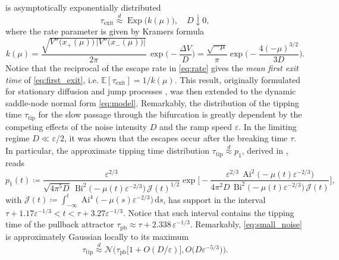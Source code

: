 \documentclass[11pt,a4paper]{article}
\theoremstyle{plain}
\theoremstyle{definition}
\theoremstyle{remark}
\newcommand{\dd}{\mathrm{d}}
\newcommand{\Ai}{\operatorname{Ai}}
\newcommand{\Bi}{\operatorname{Bi}}
\newcommand{\E}{\mathbb{E}}
\newcommand{\Exp}{\operatorname{Exp}}
\begin{document}
%
is asymptotically exponentially distributed \cite[Thm.~$2.3$]{Berglund2013}
%
\begin{equation}\label{eq:large_deviation_principle}
        \tau_{\mathrm{exit}}\overset{d}{\approx}\Exp\bigl(k(\mu)\bigr) , \quad D\downarrow0,
\end{equation}
%
where the rate parameter is given by Kramers formula
%
\begin{equation}\label{eq:rate}
        k(\mu)=\frac{\sqrt{V''\bigl(x_+(\mu)\bigr)\,|V''\bigl(x_-(\mu)\bigr)|}}{2\pi}\,\exp\biggl(-\frac{\Delta V}{D}\biggr)
        =\frac{\sqrt{-\mu}}{\pi}\exp\biggl(-\frac{4(-\mu)^{3/2}}{3D}\biggr).
\end{equation}
%
Notice that the reciprocal of the escape rate in \eqref{eq:rate} gives the \emph{mean first exit time} of \eqref{eq:first_exit}, i.e. $\E[\tau_{\mathrm{exit}}] = 1/k(\mu)$.
This result, originally formulated for stationary diffusion \cite{Day1983} and jump processes \cite{Imkeller2006}, was then extended to the dynamic saddle-node normal form \eqref{eq:model}.
Remarkably, the distribution of the tipping time $\tau_{\mathrm{tip}}$ for the slow passage through the bifurcation is greatly dependent by the competing effects of the noise intensity $D$ and the ramp speed $\varepsilon$.
In the limiting regime $D\ll\varepsilon/2$, it was shown that the escapes occur after the breaking time $\tau$.
In particular, the approximate tipping time distribution $\tau_{\mathrm{tip}}\overset{d}{\approx}p_1$, derived in \cite[Eq.~$(19)$]{Miller2012}, reads
%
\begin{equation}\label{eq:small_noise}
        p_1(t)\coloneqq\frac{\varepsilon^{2/3}}{\sqrt{4\pi^{5}D}\,\Bi^{2}\bigl(-\mu(t)\varepsilon^{-2/3}\bigr)\,\mathcal J(t)^{1/2}}
        \exp\Biggl[-\frac{\varepsilon^{2/3}\,\Ai^{2}\bigl(-\mu(t)\varepsilon^{-2/3}\bigr)}
        {4\pi^{2}D\,\Bi^{2}\bigl(-\mu(t)\varepsilon^{-2/3}\bigr)\,\mathcal J(t)}\Biggr] ,
\end{equation}
%
with $\mathcal J(t)\coloneqq\int_{-\infty}^{t}\Ai^{4}\bigl(-\mu(s)\varepsilon^{-2/3}\bigr)\,\dd s$, has support in the interval $\tau+1.17 \varepsilon^{-1/3} < t < \tau + 3.27 \varepsilon^{-1/3}$.
Notice that such interval contains the tipping time of the pullback attractor $\tau_{\mathrm{pb}}\approx\tau+2.338\,\varepsilon^{-1/3}$.
Remarkably, \eqref{eq:small_noise} is approximately Gaussian locally to its maximum
%
\begin{equation}\label{eq:small_noise_approximation}
        \tau_{\mathrm{tip}}\overset{d}{\approx}\mathcal{N}\biggl(\tau_{\mathrm{pb}}\bigl[1+O(D/\varepsilon)\bigr],O\bigl(D\varepsilon^{-5/3}\bigr)\biggr).
\end{equation}
\end{document}
